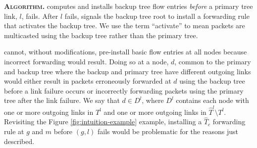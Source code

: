 

{\bf \pre \textsc{Algorithm.}}
\pre computes and installs backup tree flow entries \emph{before} a primary tree link, $l$, fails.  After $l$ fails, \pre signals the backup tree root
to install a forwarding rule that activates the backup tree.  We use the term ``activate'' to mean packets are multicasted using the backup tree rather than the primary tree.


\pre cannot, without modifications, pre-install basic flow entries at all nodes because incorrect forwarding would result. Doing so at a node, $d$, common to the primary and backup tree
where the backup and primary tree have different outgoing links would either result in packets erroneously forwarded at $d$ using the backup tree before a link failure occurs or 
incorrectly forwarding packets using the primary tree after the link failure. 
We say that $d \in D^l$, where $D^l$ contains each node with one or more outgoing links in $T^l$ and one or more outgoing links in $\hat{T}^l \setminus T^l$.
Revisiting the Figure \ref{fig:intuition-example} example, installing a $\hat{T}_c$ forwarding rule at $g$ and $m$ before $(g,l)$ fails would be problematic for the reasons just described.




